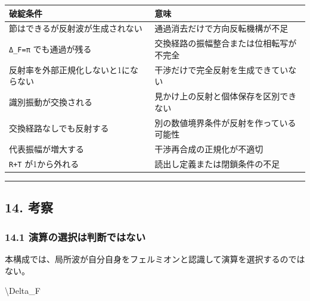 \documentclass[
  a4paper,
]{article}
\newenvironment{Shaded}{}{}
\newcommand{\NormalTok}[1]{#1}
\newcounter{none} %
\begin{document}
{\def\LTcaptype{none} %
\begin{longtable}[]{@{}
  >{\raggedright\arraybackslash}p{}
  >{\raggedright\arraybackslash}p{}@{}}
\toprule\noalign{}
\begin{minipage}[b]{\linewidth}\raggedright
破綻条件
\end{minipage} & \begin{minipage}[b]{\linewidth}\raggedright
意味
\end{minipage} \\
\midrule\noalign{}
\endhead
\bottomrule\noalign{}
\endlastfoot
節はできるが反射波が生成されない & 通過消去だけで方向反転機構が不足 \\
\texttt{Δ\_F=π} でも通過が残る &
交換経路の振幅整合または位相転写が不完全 \\
反射率を外部正規化しないと1にならない &
干渉だけで完全反射を生成できていない \\
識別振動が交換される & 見かけ上の反射と個体保存を区別できない \\
交換経路なしでも反射する & 別の数値境界条件が反射を作っている可能性 \\
代表振幅が増大する & 干渉再合成の正規化が不適切 \\
\texttt{R+T} が1から外れる & 読出し定義または閉鎖条件の不足 \\
\end{longtable}
}

\begin{center}\rule{0.5\linewidth}{0.5pt}\end{center}

\subsection{14. 考察}\label{ux8003ux5bdf}

\subsubsection{14.1
演算の選択は判断ではない}\label{ux6f14ux7b97ux306eux9078ux629eux306fux5224ux65adux3067ux306fux306aux3044}

本構成では、局所波が自分自身をフェルミオンと認識して演算を選択するのではない。

\begin{Shaded}
\begin{Highlighting}[]
\NormalTok{\textbackslash{}Delta\_F}
\end{Highlighting}
\end{Shaded}
\end{document}
